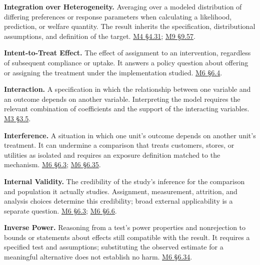 \noindent\textbf{Integration over Heterogeneity.} Averaging over a modeled
distribution of differing preferences or response parameters when
calculating a likelihood, prediction, or welfare quantity. The result
inherits the specification, distributional assumptions, and definition
of the target.
\href{Marketing_Analytics_Lecture_Notes.pdf\#M04-released-retail-data-integrated-heterogeneity-and-competing-explanations}{M4
§4.31};
\hyperref[M09-heterogeneity-and-the-interpretation-of-consumer-harm]{M9
§9.57}.

\noindent\textbf{Intent-to-Treat Effect.} The effect of assignment to an
intervention, regardless of subsequent compliance or uptake. It answers
a policy question about offering or assigning the treatment under the
implementation studied.
\href{Marketing_Analytics_Lecture_Notes.pdf\#M06-case-study-estimate-an-email-assignment-effect}{M6
§6.4}.

\noindent\textbf{Interaction.} A specification in which the relationship between
one variable and an outcome depends on another variable. Interpreting
the model requires the relevant combination of coefficients and the
support of the interacting variables.
\href{Marketing_Analytics_Lecture_Notes.pdf\#M03-interactions-describe-how-a-relationship-changes}{M3
§3.5}.

\noindent\textbf{Interference.} A situation in which one unit's outcome depends
on another unit's treatment. It can undermine a comparison that treats
customers, stores, or utilities as isolated and requires an exposure
definition matched to the mechanism.
\href{Marketing_Analytics_Lecture_Notes.pdf\#M06-designing-an-experiment-around-the-decision}{M6
§6.3};
\href{Marketing_Analytics_Lecture_Notes.pdf\#M06-institutional-exposure-and-the-meaning-of-an-untreated-utility}{M6
§6.35}.

\noindent\textbf{Internal Validity.} The credibility of the study's inference for
the comparison and population it actually studies. Assignment,
measurement, attrition, and analysis choices determine this credibility;
broad external applicability is a separate question.
\href{Marketing_Analytics_Lecture_Notes.pdf\#M06-designing-an-experiment-around-the-decision}{M6
§6.3};
\href{Marketing_Analytics_Lecture_Notes.pdf\#M06-implementation-checks-that-protect-the-comparison}{M6
§6.6}.

\noindent\textbf{Inverse Power.} Reasoning from a test's power properties and
nonrejection to bounds or statements about effects still compatible with
the result. It requires a specified test and assumptions; substituting
the observed estimate for a meaningful alternative does not establish no
harm.
\href{Marketing_Analytics_Lecture_Notes.pdf\#M06-inverse-power-and-the-scope-of-nonrejection}{M6
§6.34}.

